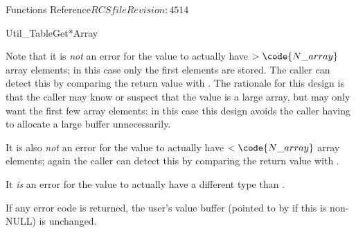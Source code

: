 \begin{cactuspart}{ Functions Reference}{$RCSfile$}{$Revision: 4514 $}
\begin{FunctionDescription}{Util\_TableGet*Array}
\begin{Discussion}
Note that it is {\em not\/} an error for the value to actually have
$> \code{N\_array}$ array elements; in this case only the first 
elements are stored.  The caller can detect this by comparing the
return value with .
The rationale for this design is that the caller may know or suspect
that the value is a large array, but may only want the first few array
elements; in this case this design avoids the caller having to allocate
a large buffer unnecessarily.

It is also {\em not\/} an error for the value to actually have
$< \code{N\_array}$ array elements; again the caller can detect this by
comparing the return value with .

It {\em is\/} an error for the value to actually have a different type
than .

If any error code is returned, the user's value buffer
(pointed to by  if this is non-NULL) is unchanged.
\end{Discussion}


\end{FunctionDescription}
\end{cactuspart}
